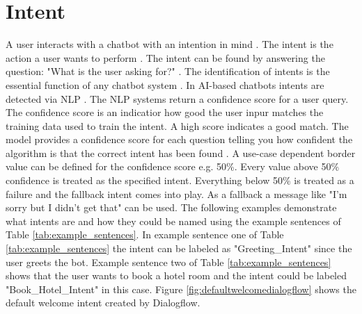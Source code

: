 \section{Intent} \label{sec:intent}
A user interacts with a chatbot with an intention in mind \cite{buiildChatbotsPython, singhbuilding}.
The intent is the action a user wants to perform \cite{dutta2017developing, rahman2017programming}.
The intent can be found by answering the question: "What is the user asking for?" \cite{buiildChatbotsPython}.
The identification of intents is the essential function of any chatbot system \cite{singhbuilding}.
In AI-based chatbots intents are detected via NLP \cite{singhbuilding}. 
The NLP systems return a confidence score for a user query.
The confidence score is an indicatior how good the user inpur matches the training data used to train the intent.
A high score indicates a good match.
The model provides a confidence score for each question telling you how 
confident the algorithm is that the correct intent has been found \cite{buiildChatbotsPython}.
A use-case dependent border value can be defined for the confidence score e.g. 50\%. 
Every value above 50\% confidence is treated as the specified intent.
Everything below 50\% is treated as a failure and the fallback intent comes into play.
As a fallback a message like "I'm sorry but I didn't get that" can be used.
The following examples demonstrate what intents are and how they could be named using the
example sentences of Table \ref{tab:example_sentences}.
In example sentence one of Table \ref{tab:example_sentences} the intent can be labeled as 
"Greeting\_Intent" since the user greets the bot.
Example sentence two of Table \ref{tab:example_sentences} shows that the user wants to book
a hotel room and the intent could be labeled "Book\_Hotel\_Intent" in this case.
Figure \ref{fig:defaultwelcomedialogflow} shows the default welcome intent created by Dialogflow. 



